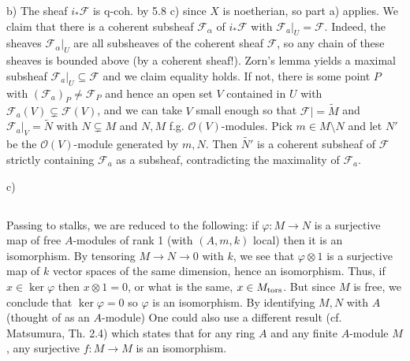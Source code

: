 \documentclass{report}
\newcommand{\F}{\mathcal{F}}
\renewcommand{\O}{\mathcal{O}}
\begin{document}
\noindent
b)	The sheaf $i_*\F$ is q-coh. by 5.8 c) since $X$ is noetherian, so part a) applies.  We claim that there is
a coherent subsheaf $\F_{\alpha}$ of $i_*\F$ with $\F_{a}\big|_U=\F$.
Indeed, the sheaves $\F_{\alpha}\big|_U$ are all subsheaves of the coherent sheaf $\F$, so any chain
of these sheaves is bounded above (by a coherent sheaf!).  Zorn's lemma yields a maximal subsheaf $\F_a\big|_U\subseteq \F$
and we claim equality holds.  If not, there is some point $P$ with $(\F_a)_P\neq \F_P$ and hence an open set $V$ contained in $U$
with $\F_a(V)\subsetneq \F(V)$, and we can take $V$ small enough so that $\F\big|=\widetilde{M}$ and $\F_a\big|_V=\widetilde{N}$
with $N\subsetneq M$ and $N,M$ f.g. $\O(V)$-modules.  Pick $m\in M\setminus N$ and let $N'$ be the $\O(V)$-module
generated by $m,N$.  Then $\widetilde{N'}$ is a coherent subsheaf of $\F$ strictly containing $\F_a$ as a subsheaf,
contradicting the maximality of $\F_a$.

\noindent
c)	




\section{}

	Passing to stalks, we are reduced to the following: if $\varphi:M\rightarrow N$ is a surjective map of free $A$-modules of rank 1
(with $(A,m,k)$ local) then it is an isomorphism.	By tensoring $M\rightarrow N\rightarrow 0$ with $k$,
we see that $\varphi \otimes 1$ is a surjective map of $k$ vector spaces of the same dimension, hence an isomorphism.
Thus, if $x\in\ker \varphi$ then $x\otimes 1=0$, or what is the same, $x\in M_{\rm tors}$.  But since $M$ is free,
we conclude that $\ker\varphi=0$ so $\varphi$ is an isomorphism.	 By identifying $M,N$ with $A$ (thought of as an $A$-module)
One could also use a different result
(cf. Matsumura, Th. 2.4) which states that for any ring $A$ and any finite $A$-module $M$, any surjective $f:M\rightarrow M$
is an isomorphism.

\bigskip
{}	


\chapter{}


\section{}
\end{document}
